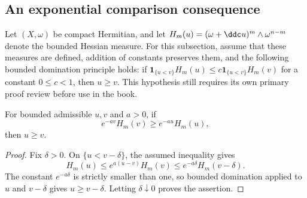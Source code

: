 \subsection{An exponential comparison consequence}

Let $(X,\omega)$ be compact Hermitian, and let $H_m(u)=(\omega+\ddc u)^m\wedge\omega^{n-m}$ denote the bounded Hessian measure. For this subsection, assume that these measures are defined, addition of constants preserves them, and the following bounded domination principle holds: if
$\mathbf1_{\{u<v\}}H_m(u)\leq c\mathbf1_{\{u<v\}}H_m(v)$ for a constant $0\leq c<1$, then $u\geq v$.
This hypothesis still requires its own primary proof review before use in the book.

\begin{lemma}\label{draft:595-hessian-exponential-order}
For bounded admissible $u,v$ and $a>0$, if
\[
 e^{-av}H_m(v)\geq e^{-au}H_m(u),
\]
then $u\geq v$.
\end{lemma}
\begin{proof}
Fix $\delta>0$. On $\{u<v-\delta\}$, the assumed inequality gives
\[
 H_m(u)\leq e^{a(u-v)}H_m(v)
       \leq e^{-a\delta}H_m(v-\delta).
\]
The constant $e^{-a\delta}$ is strictly smaller than one, so bounded domination applied to $u$ and $v-\delta$ gives $u\geq v-\delta$. Letting $\delta\downarrow0$ proves the assertion.
\end{proof}
